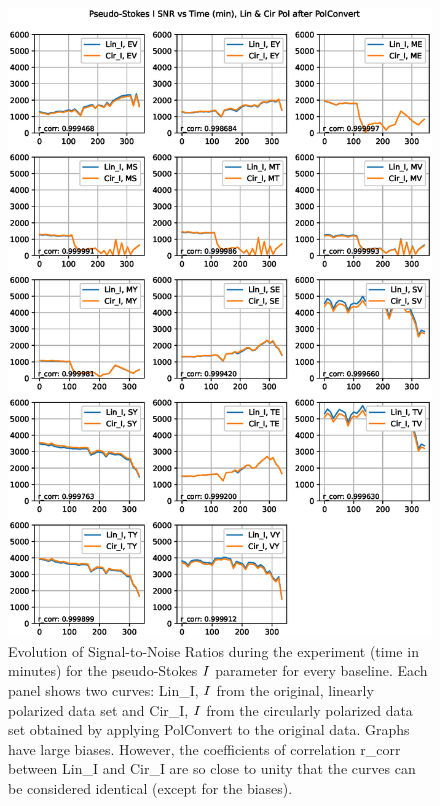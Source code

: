 \documentclass[letterpaper,twoside,12pt]{article}
\begin{document}
\begin{figure}[ht!]
  \begin{center}
  \includegraphics[width=33pc]{SNR_Lin_I_and_Cir_I.eps}
  \caption{\small Evolution of Signal-to-Noise Ratios during the experiment (time in minutes) for the pseudo-Stokes $\protect I$ parameter for every baseline. Each panel shows two curves: Lin\_I, $\protect I$ from the original, linearly polarized data set and Cir\_I, $\protect I$ from the circularly polarized data set obtained by applying PolConvert to the original data. Graphs have large biases. However, the coefficients of correlation r\_corr between Lin\_I and Cir\_I are so close to unity that the curves can be considered identical (except for the biases).}
  \label{snr_lin_and_cir}
  \end{center}
\end{figure}
\end{document}
